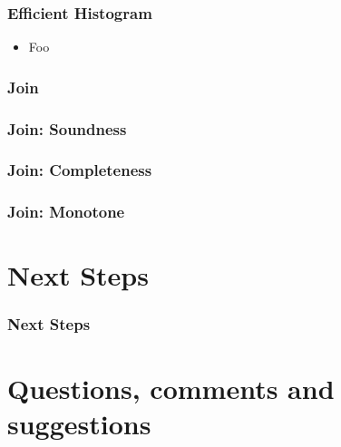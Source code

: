\documentclass[aspectratio=169,10pt]{beamer}
\begin{document}
\begin{frame}
  \frametitle{Efficient Histogram}
  \begin{itemize}
    \item Foo
  \end{itemize}
\end{frame}

\begin{frame}
  \frametitle{Join}
\end{frame}

\begin{frame}
  \frametitle{Join: Soundness}
\end{frame}

\begin{frame}
  \frametitle{Join: Completeness}
\end{frame}

\begin{frame}
  \frametitle{Join: Monotone}
\end{frame}

\section{Next Steps}

\begin{frame}
  \frametitle{Next Steps}
\end{frame}

\section{Questions, comments and suggestions}
\end{document}
